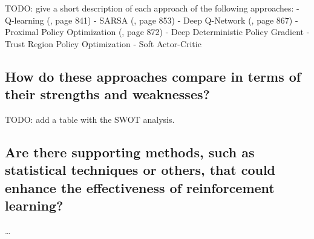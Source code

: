 TODO: give a short description of each approach of the following approaches:
- Q-learning (\cite{rn2022aima}, page 841)
- SARSA (\cite{rn2022aima}, page 853)
- Deep Q-Network (\cite{rn2022aima}, page 867)
- Proximal Policy Optimization (\cite{rn2022aima}, page 872)
- Deep Deterministic Policy Gradient
- Trust Region Policy Optimization
- Soft Actor-Critic

\subsection{How do these approaches compare in terms of their strengths and weaknesses?  }

TODO: add a table with the SWOT analysis.

\subsection{Are there supporting methods, such as statistical techniques or others, that could enhance the effectiveness of reinforcement learning?}
\dots
